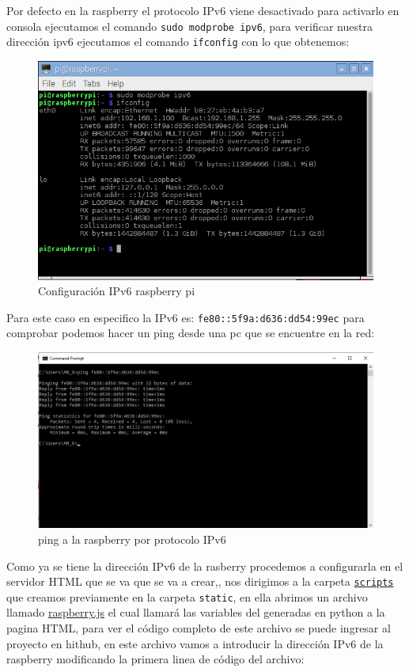 \documentclass[10pt]{article}\usepackage[]{graphicx}\usepackage[]{color}
\begin{document}
Por defecto en la raspberry el protocolo IPv6 viene desactivado para activarlo en consola ejecutamos el comando \texttt{sudo modprobe ipv6}, para verificar nuestra dirección ipv6 ejecutamos el comando \texttt{ifconfig} con lo que obtenemos:

		\begin{figure}[H] 
			\centering
			\includegraphics[scale=0.8]{ip6_1}   %
			\caption{Configuración IPv6 raspberry pi}	
		\end{figure}
Para este caso en especifico la IPv6 es: \texttt{fe80::5f9a:d636:dd54:99ec} para comprobar podemos hacer un ping desde una pc que se encuentre en la red:

		\begin{figure}[H] 
			\centering
			\includegraphics[scale=0.4]{ip6_2}  
			\caption{ping a la raspberry por protocolo IPv6 }	
		\end{figure}
Como ya se tiene la dirección IPv6 de la rasberry procedemos a configurarla en el servidor HTML que se va que se va a crear,, nos dirigimos a la carpeta \href{https://github.com/wilrilo/repo_final_nube/tree/master/repo_final_nube/ProyectoF_Pi/static/scripts}{\texttt{scripts}} que creamos previamente en la carpeta \texttt{static}, en ella abrimos un archivo llamado \href{https://github.com/wilrilo/repo_final_nube/blob/master/repo_final_nube/ProyectoF_Pi/static/scripts/raspberry.js}{raspberry.js} el cual llamará las variables del generadas en python a la pagina HTML, para ver el código completo de este archivo se puede ingresar al proyecto en hithub, en este archivo vamos a introducir la dirección IPv6 de la raspberry modificando la primera linea de código del archivo:
\end{document}
